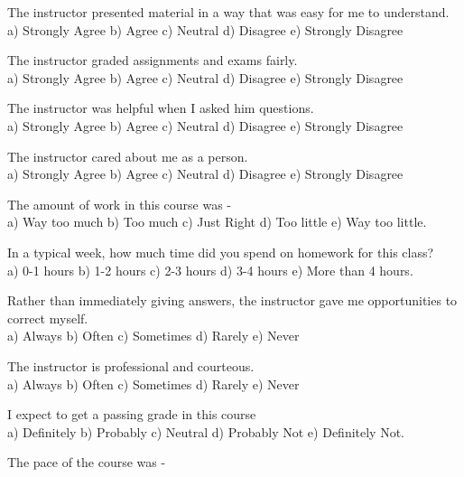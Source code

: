 \documentclass[10pt]{examdesign}
\begin{document}
\begin{multiplechoice} [title={Survey Questions (1 Point Each)},
	rearrange=no]
\begin{question}
The instructor presented material in a way that was easy for me to understand.
\\a) Strongly Agree	b) Agree	c) Neutral	d) Disagree	e) Strongly Disagree
\end{question}
\begin{question}
The instructor graded assignments and exams fairly. 
\\a) Strongly Agree	b) Agree	c) Neutral	d) Disagree	e) Strongly Disagree
\end{question}
\begin{question}
The instructor was helpful when I asked him questions.
\\a) Strongly Agree	b) Agree	c) Neutral	d) Disagree	e) Strongly Disagree
\end{question}
\begin{question}
The instructor cared about me as a person.
\\a) Strongly Agree	b) Agree	c) Neutral	d) Disagree	e) Strongly Disagree
\end{question}
\begin{question}
The amount of work in this course was - 
\\a) Way too much	b) Too much	c) Just Right	d) Too little	e) Way too little.
\end{question}
\begin{question}
In a typical week, how much time did you spend on homework for this class?
\\a) 0-1 hours	b) 1-2 hours	c) 2-3 hours	d) 3-4 hours 	e) More than 4 hours.
\end{question}
\begin{question}
Rather than immediately giving answers, the instructor gave me opportunities to correct myself.
\\a) Always	b) Often		c) Sometimes	d) Rarely	e) Never
\end{question}
\begin{question}
The instructor is  professional and courteous.
\\a) Always	b) Often		c) Sometimes	d) Rarely	e) Never
\end{question}
\begin{question}
I expect to get a passing grade in this course
\\a) Definitely	b) Probably	c) Neutral	d) Probably Not	e) Definitely Not.
\end{question}
\begin{question}
The pace of the course was - 

\end{question}
\end{multiplechoice}
\end{document}

